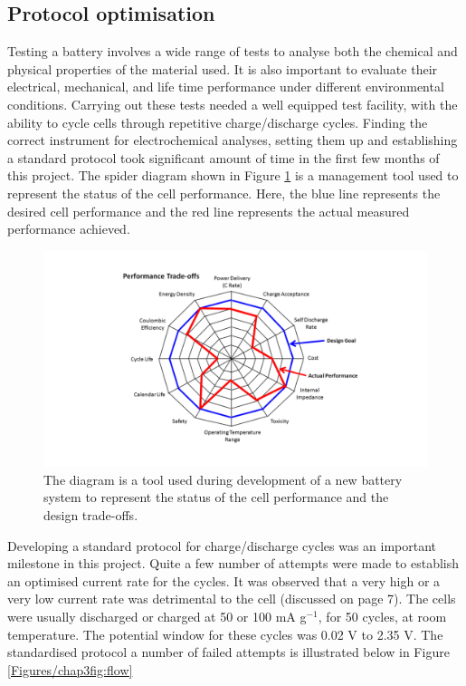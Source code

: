 \subsection*{Protocol optimisation}
Testing a battery involves a wide range of tests to analyse both the chemical and physical properties of the material used. It is also important to evaluate their electrical, mechanical, and life time performance under different environmental conditions.
Carrying out these tests needed a well equipped test facility, with the ability to cycle cells through repetitive charge/discharge cycles. Finding the correct instrument for electrochemical analyses, setting them up and establishing a standard protocol took significant amount of time in the first few months of this project.
The spider diagram shown in Figure \ref{Figures/chap3fig:perf} is a management tool used to represent the status of the cell performance. Here, the blue line represents the desired cell performance and the red line represents the actual measured performance achieved.

\begin{figure}[tbh!]
\centering
\includegraphics[width=\textwidth]{Figures/chap3fig/perf.pdf}
\caption{The diagram is a tool used during development of a new battery system to represent the status of the cell performance and the design trade-offs.}
\label{Figures/chap3fig:perf}
\end{figure}

Developing a standard protocol for charge/discharge cycles was an important milestone in this project. Quite a few number of attempts were made to establish an optimised current rate for the cycles. It was observed that a very high or a very low current rate was detrimental to the cell (discussed on page 7). The cells were usually discharged or charged at 50 or 100 mA g$^{-1}$, for 50 cycles, at room temperature. The potential window for these cycles was 0.02 V to 2.35 V. 
The standardised protocol a number of failed attempts is illustrated below in Figure \ref{Figures/chap3fig:flow}

